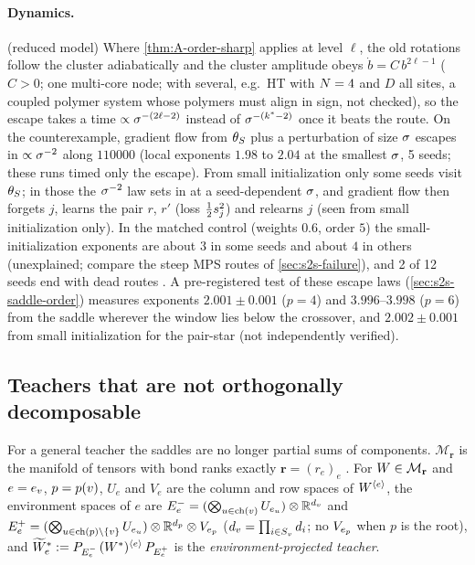 \paragraph{Dynamics.} \derived{} (reduced model) Where \cref{thm:A-order-sharp} applies at level $\ell$, the old
rotations follow the cluster adiabatically and the cluster amplitude obeys $\dot b=C\,b^{2\ell-1}$ ($C>0$; one
multi-core node; with several, e.g.\ HT with $\Ns=4$ and $D$ all sites, a coupled polymer system whose polymers
must align in sign, not checked), so the escape takes a time $\propto\isc^{-(2\ell-2)}$ instead of $\isc^{-(k^*-2)}$
once it beats the route. On the
counterexample, gradient flow from $\params_S$ plus a perturbation of size $\isc$ escapes in $\propto\isc^{-2}$ along
$110000$ (local exponents $1.98$ to $2.04$ at the smallest $\isc$, 5 seeds; these runs timed only the escape).
From small initialization only some seeds visit $\params_S$; in those the $\isc^{-2}$ law sets in at a
seed-dependent $\isc$, and gradient flow then forgets $j$, learns the pair $r$, $r'$ (loss $\frac12\tw j^2$) and
relearns $j$ \empirical{} (seen from small initialization only). In the matched control
(weights $0.6$, order $5$) the small-initialization exponents are about $3$ in some seeds and about $4$ in others
(unexplained; compare the steep MPS routes of \cref{sec:s2s-failure}), and 2 of 12 seeds end with dead routes
\empirical.
A pre-registered test of these escape laws (\cref{sec:s2s-saddle-order}) measures exponents $2.001\pm0.001$
($p=4$) and $3.996$--$3.998$ ($p=6$) from the saddle wherever the window lies below the crossover, and
$2.002\pm0.001$ from small initialization for the pair-star \empirical{} (not independently verified).

\subsection{Teachers that are not orthogonally decomposable}\label{app:teachers}

For a general teacher the saddles are no longer partial sums of components. $\mathcal M_{\mathbf r}$ is the
manifold of tensors with bond ranks exactly $\mathbf r=(r_e)_e$ \citep{holtz2012manifolds,uschmajew2013geometry}.
For $\W\in\mathcal M_{\mathbf r}$ and $e=\edge v$, $p=\pa v$, $U_e$ and $V_e$ are the column and row spaces of
$\mat{\W}{e}$, the environment spaces of $e$ are $E_e^-=(\bigotimes_{u\in\ch v}U_{\edge u})\otimes\R^{d_v}$ and
$E_e^+=(\bigotimes_{u\in\ch p\setminus\{v\}}U_{\edge u})\otimes\R^{d_p}\otimes V_{\edge p}$ ($d_v=\prod_{i\in\sites v}\pd[i]$; no
$V_{\edge p}$ when $p$ is the root), and $\widetilde W^*_e:=P_{E_e^-}\,\mat{(\Wt)}{e}\,P_{E_e^+}$ is the
\emph{environment-projected teacher}.

